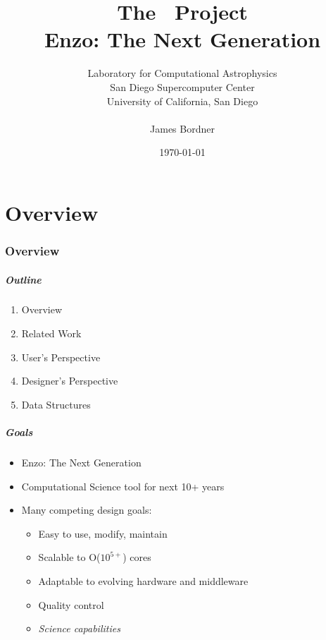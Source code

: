 \documentclass{beamer}
\title[The \cello\ Project]
      {The \cello\ Project \\ \small{Enzo: The Next Generation}}
\author[James Bordner]{\small Laboratory for Computational Astrophysics \\ San Diego Supercomputer Center \\ University of California, San Diego \\ \ \\ James Bordner}
\date{\today}
\newcommand{\enzo}{\textsf{Enzo}}
\begin{document}
\begin{frame}
\titlepage
\end{frame}


% 

\part{Overview}

\section{Overview}

\begin{frame}
\frametitle{Outline}

\begin{enumerate}
\item Overview
\item Related Work
\item User's Perspective
\item Designer's Perspective
\item Data Structures
\end{enumerate}
\end{frame}

\begin{frame}
\frametitle{Goals}

\begin{itemize}
\item \enzo: The Next Generation
\item Computational Science tool for next 10+ years
\item Many competing design goals:
\begin{itemize}
\item Easy to use, modify, maintain
\item Scalable to O($10^{5+}$)  cores
\item Adaptable to evolving hardware and middleware
\item Quality control
\item \textit{Science capabilities}
\end{itemize}
\end{itemize}
\end{frame}
\end{document}
